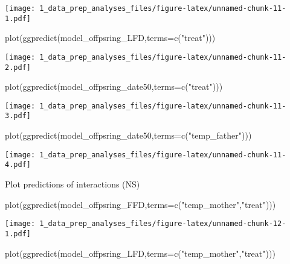 \documentclass[
]{article}
\newenvironment{Shaded}{\begin{snugshade}}{\end{snugshade}}
\newcommand{\AttributeTok}[1]{\textcolor[rgb]{0.77,0.63,0.00}{#1}}
\newcommand{\FunctionTok}[1]{\textcolor[rgb]{0.00,0.00,0.00}{#1}}
\newcommand{\NormalTok}[1]{#1}
\newcommand{\StringTok}[1]{\textcolor[rgb]{0.31,0.60,0.02}{#1}}
\begin{document}
\texttt{[image: 1\_data\_prep\_analyses\_files/figure-latex/unnamed-chunk-11-1.pdf]}

\begin{Shaded}
\begin{Highlighting}[]
\FunctionTok{plot}\NormalTok{(}\FunctionTok{ggpredict}\NormalTok{(model\_offpsring\_LFD,}\AttributeTok{terms=}\FunctionTok{c}\NormalTok{(}\StringTok{"treat"}\NormalTok{)))}
\end{Highlighting}
\end{Shaded}

\texttt{[image: 1\_data\_prep\_analyses\_files/figure-latex/unnamed-chunk-11-2.pdf]}

\begin{Shaded}
\begin{Highlighting}[]
\FunctionTok{plot}\NormalTok{(}\FunctionTok{ggpredict}\NormalTok{(model\_offpsring\_date50,}\AttributeTok{terms=}\FunctionTok{c}\NormalTok{(}\StringTok{"treat"}\NormalTok{)))}
\end{Highlighting}
\end{Shaded}

\texttt{[image: 1\_data\_prep\_analyses\_files/figure-latex/unnamed-chunk-11-3.pdf]}

\begin{Shaded}
\begin{Highlighting}[]
\FunctionTok{plot}\NormalTok{(}\FunctionTok{ggpredict}\NormalTok{(model\_offpsring\_date50,}\AttributeTok{terms=}\FunctionTok{c}\NormalTok{(}\StringTok{"temp\_father"}\NormalTok{)))}
\end{Highlighting}
\end{Shaded}

\texttt{[image: 1\_data\_prep\_analyses\_files/figure-latex/unnamed-chunk-11-4.pdf]}

Plot predictions of interactions (NS)

\begin{Shaded}
\begin{Highlighting}[]
\FunctionTok{plot}\NormalTok{(}\FunctionTok{ggpredict}\NormalTok{(model\_offpsring\_FFD,}\AttributeTok{terms=}\FunctionTok{c}\NormalTok{(}\StringTok{"temp\_mother"}\NormalTok{,}\StringTok{"treat"}\NormalTok{)))}
\end{Highlighting}
\end{Shaded}

\texttt{[image: 1\_data\_prep\_analyses\_files/figure-latex/unnamed-chunk-12-1.pdf]}

\begin{Shaded}
\begin{Highlighting}[]
\FunctionTok{plot}\NormalTok{(}\FunctionTok{ggpredict}\NormalTok{(model\_offpsring\_LFD,}\AttributeTok{terms=}\FunctionTok{c}\NormalTok{(}\StringTok{"temp\_mother"}\NormalTok{,}\StringTok{"treat"}\NormalTok{)))}
\end{Highlighting}
\end{Shaded}
\end{document}
